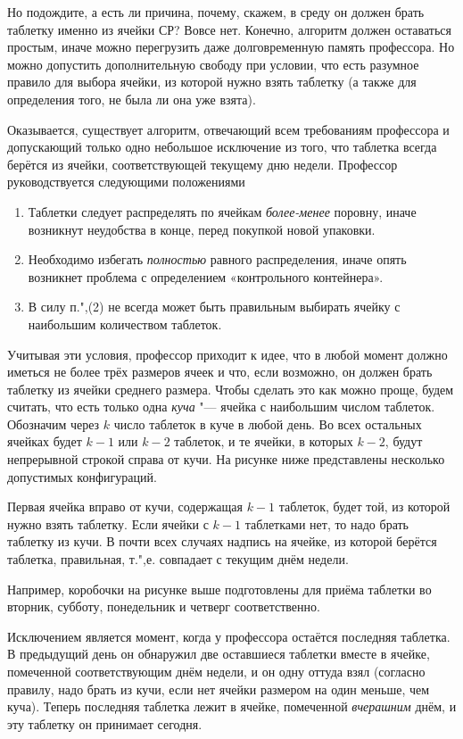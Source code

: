 \documentclass[twoside]{book}
\begin{document}
Но подождите, а есть ли причина, почему, скажем, в среду он должен брать таблетку именно из ячейки СР?
Вовсе нет.
Конечно, алгоритм должен оставаться простым, иначе можно перегрузить даже долговременную память профессора.
Но можно допустить дополнительную свободу при условии, что есть разумное правило для выбора ячейки, из которой нужно взять таблетку (а также для определения того, не была ли она уже взята).

Оказывается, существует алгоритм, отвечающий всем требованиям профессора и допускающий только одно небольшое исключение из того, что таблетка всегда берётся из ячейки, соответствующей текущему дню недели.
Профессор руководствуется следующими положениями

\begin{enumerate}[label=(\arabic*),noitemsep,leftmargin=\parindent,labelsep=3.5pt]
\item Таблетки следует распределять по ячейкам \emph{более-менее} поровну, иначе возникнут неудобства в конце, перед покупкой новой упаковки.
\item Необходимо избегать \emph{полностью} равного распределения, иначе опять возникнет проблема с определением «контрольного контейнера».
\item В силу п.",(2) не всегда может быть правильным выбирать ячейку с наибольшим количеством таблеток.
\end{enumerate}

Учитывая эти условия, профессор приходит к идее, что в любой момент должно иметься не более трёх размеров ячеек и что, если возможно, он должен брать таблетку из ячейки среднего размера.
Чтобы сделать это как можно проще, будем считать, что есть только одна \emph{куча} "--- ячейка с наибольшим числом таблеток.
Обозначим через $k$ число таблеток в куче в любой день.
Во всех остальных ячейках будет $k-1$ или $k-2$ таблеток, и те ячейки, в которых $k-2$, будут непрерывной строкой справа от кучи.
На рисунке ниже представлены несколько допустимых конфигураций.

Первая ячейка вправо от кучи, содержащая $k-1$ таблеток, будет той, из которой нужно взять таблетку.
Если ячейки с $k-1$ таблетками нет, то надо брать таблетку из кучи.
В почти всех случаях надпись на ячейке, из которой берётся таблетка, правильная, т.",е. совпадает с текущим днём недели.

Например, коробочки на рисунке выше подготовлены для приёма таблетки во вторник, субботу, понедельник и четверг соответственно.

Исключением является момент, когда у профессора остаётся последняя таблетка.
В предыдущий день он обнаружил две оставшиеся таблетки вместе в ячейке, помеченной соответствующим днём недели, и он одну оттуда взял (согласно правилу, надо брать из кучи, если нет ячейки размером на один меньше, чем куча).
Теперь последняя таблетка лежит в ячейке, помеченной \emph{вчерашним} днём, и эту таблетку он принимает сегодня.
\end{document}
